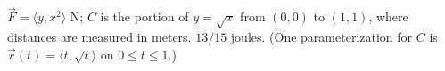 {$\vec F = \langle y,x^2\rangle$ N; $C$ is the portion of $y=\sqrt x$ from $(0,0)$ to $(1,1)$, where distances are measured in meters.
}
{$13/15$ joules. (One parameterization for $C$ is $\vec r(t) = \langle t,\sqrt t\rangle$ on $0\leq t\leq 1$.)
}
